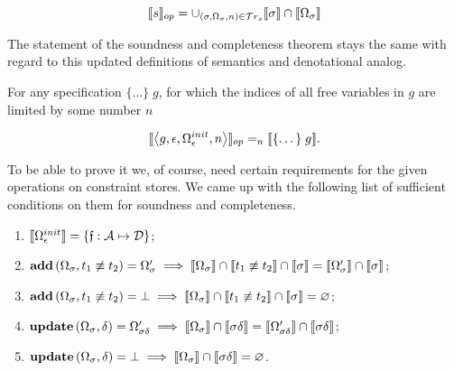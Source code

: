  \[
\llbracket{s}\rrbracket_{op} = \cup_{(\sigma, \Omega_\sigma, n) \in \mathcal{T}r_{s}} \llbracket{\sigma}\rrbracket \cap \llbracket{\Omega_\sigma}\rrbracket
\]

The statement of the soundness and completeness theorem stays the same with regard to this updated definitions of semantics and denotational analog.

\begin{theorem}
For any specification $\{\dots\}\; g$, for which the indices of all free variables in $g$ are limited by some number $n$

\[
\llbracket{\left<{g, \epsilon, \Omega_\epsilon^{init}, n}\right>}\rrbracket_{op} =_n \llbracket{\{\dots\}\; g}\rrbracket.
\]
\end{theorem}

To be able to prove it we, of course, need certain requirements for the given operations on constraint stores. We came up with the following list of sufficient
conditions on them for soundness and completeness.

\begin{enumerate}
\item $\llbracket{\Omega_\epsilon^{init}}\rrbracket = \{\mathfrak{f}:\mathcal{A}\mapsto\mathcal{D}\}$;
\item $\mathbf{add}\,(\Omega_\sigma, t_1 \not\equiv t_2) = \Omega^\prime_\sigma \implies \llbracket{\Omega_\sigma}\rrbracket \cap \llbracket{t_1 \not\equiv t_2}\rrbracket \cap \llbracket{\sigma}\rrbracket = \llbracket{\Omega^\prime_\sigma}\rrbracket \cap \llbracket{\sigma}\rrbracket$;
\item $\mathbf{add}\,(\Omega_\sigma, t_1 \not\equiv t_2) = \bot \implies \llbracket{\Omega_\sigma}\rrbracket \cap \llbracket{t_1 \not\equiv t_2}\rrbracket \cap \llbracket{\sigma}\rrbracket = \varnothing$;
\item $\mathbf{update}\,(\Omega_\sigma, \delta) = \Omega^\prime_{\sigma \delta} \implies \llbracket{\Omega_\sigma}\rrbracket \cap \llbracket{\sigma \delta}\rrbracket = \llbracket{\Omega^\prime_{\sigma \delta}}\rrbracket \cap \llbracket{\sigma \delta}\rrbracket$;
\item $\mathbf{update}\,(\Omega_\sigma, \delta) = \bot \implies \llbracket{\Omega_\sigma}\rrbracket \cap \llbracket{\sigma \delta}\rrbracket = \varnothing$.
\end{enumerate}

